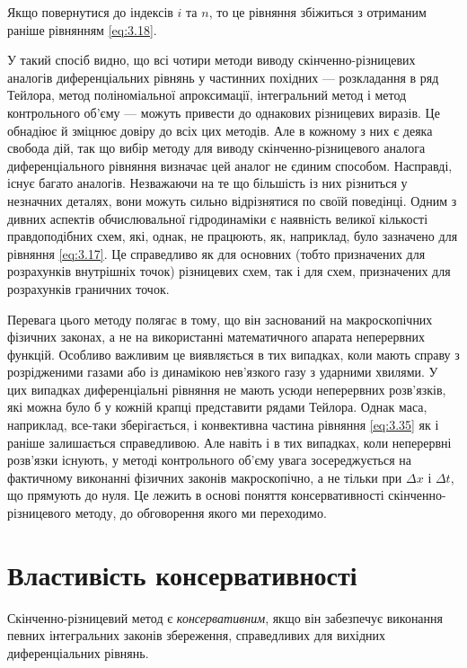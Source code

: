 Якщо повернутися до індексів $i$ та $n$, то це рівняння збіжиться з отриманим раніше рівнянням \eqref{eq:3.18}. \medskip

У такий спосіб видно, що всі чотири методи виводу скінченно-різницевих аналогів диференціальних рівнянь у частинних похідних --- розкладання в ряд Тейлора, метод поліноміальної апроксимації, інтегральний метод і метод контрольного об'єму --- можуть привести до однакових різницевих виразів. Це обнадіює й зміцнює довіру до всіх цих методів. Але в кожному з них є деяка свобода дій, так що вибір методу для виводу скінченно-різницевого аналога диференціального рівняння визначає цей аналог не єдиним способом. Насправді, існує багато аналогів. Незважаючи на те що більшість із них різниться у незначних деталях, вони можуть сильно відрізнятися по своїй поведінці. Одним з дивних аспектів обчислювальної гідродинаміки є наявність великої кількості правдоподібних схем, які, однак, не працюють, як, наприклад, було зазначено для рівняння \eqref{eq:3.17}. Це справедливо як для основних (тобто призначених для розрахунків внутрішніх точок) різницевих схем, так і для схем, призначених для розрахунків граничних точок. \medskip

Перевага цього методу полягає в тому, що він заснований на макроскопічних фізичних законах, а не на використанні математичного апарата неперервних функцій. Особливо важливим це виявляється в тих випадках, коли мають справу з розрідженими газами або із динамікою нев'язкого газу з ударними хвилями. У цих випадках диференціальні рівняння не мають усюди неперервних розв'язків, які можна було б у кожній крапці представити рядами Тейлора. Однак маса, наприклад, все-таки зберігається, і конвективна частина рівняння \eqref{eq:3.35} як і раніше залишається справедливою. Але навіть і в тих випадках, коли неперервні розв'язки існують, у методі контрольного об'єму увага зосереджується на фактичному виконанні фізичних законів макроскопічно, а не тільки при $\Delta x$ і $\Delta t$, що прямують до нуля. Це лежить в основі поняття консервативності скінченно-різницевого методу, до обговорення якого ми переходимо.

\section{Властивість консервативності} %

\begin{definition}
    Скінченно-різницевий метод є \textit{консервативним}, якщо він забезпечує виконання певних інтегральних законів збереження, справедливих для вихідних диференціальних рівнянь.
\end{definition}

